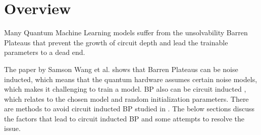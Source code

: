 \section{Overview}

Many Quantum Machine Learning models suffer from the unsolvability Barren Plateaus \cite{zhaoReviewQuantumNeural2021} that prevent the growth of circuit depth and lead the trainable parameters to a dead end.

The paper \cite{wangNoiseinducedBarrenPlateaus2021} by Samson Wang et al. shows that Barren Plateaus can be noise inducted, which means that the quantum hardware assumes certain noise models, which makes it challenging to train a model. 
BP also can be circuit inducted \cite{mccleanBarrenPlateausQuantum2018}, which relates to the chosen model and random initialization parameters.
There are methods to avoid circuit inducted BP studied in \cite{pesahAbsenceBarrenPlateaus2021, cerezoCostFunctionDependent2021,skolikLayerwiseLearningQuantum2021}.
The below sections discuss the factors that lead to circuit inducted BP and some attempts to resolve the issue.